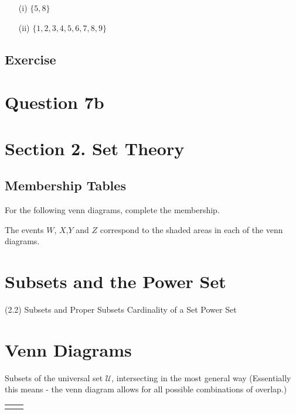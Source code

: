 \begin{itemize}
\item[(i)] $\{5,8\}$
\item[(ii)] $\{1,2,3,4,5,6,7,8,9\}$ 
\end{itemize}

\subsection*{Exercise}








\section*{Question 7b}




\section*{Section 2. Set Theory}


\subsection*{Membership Tables}
For the following venn diagrams, complete the membership.

The events $W$, $X$,$Y$ and $Z$ correspond to the shaded areas in each of the venn diagrams.



\section{Subsets and the Power Set} (2.2)
Subsets and Proper Subsets
Cardinality of a Set
Power Set




\section*{Venn Diagrams}

Subsets of the universal set $\mathcal{U}$, intersecting in the most general way (Essentially this means - the venn diagram allows for all possible combinations of overlap.)

\begin{center}
\begin{tabular}{|c|c|}
\hline  &  \\ 
\hline  &  \\ 
\hline 
\end{tabular} 
\end{center}

